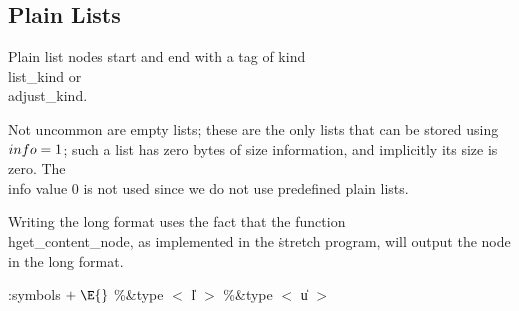 \subsection{Plain Lists}\label{plainlists}
Plain list nodes start and end with a tag of kind \\{list\_kind} or \\{adjust\_kind}.

Not uncommon are empty lists; these are the only lists that can be
stored using $\index{info+\\{info}}\\{info}=1$; such a list has zero bytes of size
information, and implicitly its size is zero. The \\{info} value 0
is not used since we do not use predefined plain lists.

Writing the long format uses the fact that the function
\\{hget\_content\_node}, as implemented in the \.{stretch} program, will
output the node in the long format.

\readcode
\Y\par
\par
\par
\par
\Y\B\4:symbols\X${}\mathrel+\E{}$\6
\8\%\&{type} $<$ \|l $>$  \6
\8\%\&{type} $<$ \|u $>$ \5
\Y
\fi



